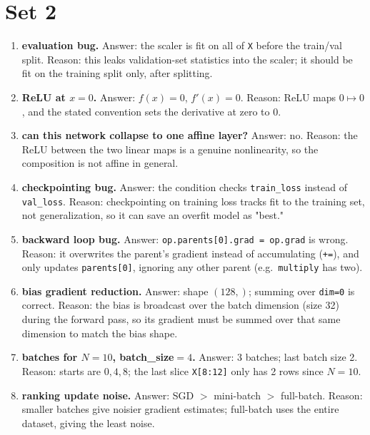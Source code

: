 \documentclass[11pt]{article}
\begin{document}
\section*{Set 2}
\begin{enumerate}

\item \textbf{evaluation bug.}
Answer: the scaler is fit on all of \texttt{X} before the train/val split.
Reason: this leaks validation-set statistics into the scaler; it should be
fit on the training split only, after splitting.

\item \textbf{ReLU at $x=0$.}
Answer: $f(x)=0$, $f'(x)=0$.
Reason: ReLU maps $0\mapsto 0$, and the stated convention sets the
derivative at zero to $0$.

\item \textbf{can this network collapse to one affine layer?}
Answer: no.
Reason: the ReLU between the two linear maps is a genuine nonlinearity, so
the composition is not affine in general.

\item \textbf{checkpointing bug.}
Answer: the condition checks \texttt{train\_loss} instead of
\texttt{val\_loss}.
Reason: checkpointing on training loss tracks fit to the training set, not
generalization, so it can save an overfit model as "best."

\item \textbf{backward loop bug.}
Answer: \texttt{op.parents[0].grad = op.grad} is wrong.
Reason: it overwrites the parent's gradient instead of accumulating
(\texttt{+=}), and only updates \texttt{parents[0]}, ignoring any other
parent (e.g.\ \texttt{multiply} has two).

\item \textbf{bias gradient reduction.}
Answer: shape $(128,)$; summing over \texttt{dim=0} is correct.
Reason: the bias is broadcast over the batch dimension (size 32) during the
forward pass, so its gradient must be summed over that same dimension to
match the bias shape.

\item \textbf{batches for $N=10$, batch\_size$=4$.}
Answer: 3 batches; last batch size 2.
Reason: starts are $0,4,8$; the last slice \texttt{X[8:12]} only has 2 rows
since $N=10$.

\item \textbf{ranking update noise.}
Answer: SGD $>$ mini-batch $>$ full-batch.
Reason: smaller batches give noisier gradient estimates; full-batch uses
the entire dataset, giving the least noise.


\end{enumerate}
\end{document}
